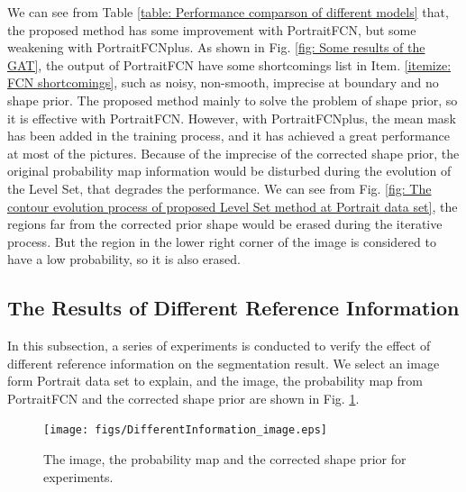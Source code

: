 We can see from Table \ref{table: Performance comparson of different models} that, the proposed method has some improvement with PortraitFCN, but some weakening with PortraitFCNplus. As shown in Fig. \ref{fig: Some results of the GAT}, the output of PortraitFCN have some shortcomings list in Item. \ref{itemize: FCN shortcomings}, such as noisy, non-smooth, imprecise at boundary and no shape prior. The proposed method mainly to solve the problem of shape prior, so it is effective with PortraitFCN. However, with PortraitFCNplus, the mean mask has been added in the training process, and it has achieved a great performance at most of the pictures. Because of the imprecise of the corrected shape prior, the original probability map information would be disturbed during the evolution of the Level Set, that degrades the performance. We can see from Fig. \ref{fig: The contour evolution process of proposed Level Set method at Portrait data set}, the regions far from the corrected prior shape would be erased during the iterative process. But the region in the lower right corner of the image is considered to have a low probability, so it is also erased.

\subsection{The Results of Different Reference Information}
In this subsection, a series of experiments is conducted to verify the effect of different reference information on the segmentation result. We select an image form Portrait data set to explain, and the image, the probability map from PortraitFCN and the corrected shape prior are shown in Fig. \ref{fig: The image, the probability map and the corrected shape prior for experiments}.
\begin{figure}[h]
    \centering
    \texttt{[image: figs/DifferentInformation\_image.eps]}
    \caption{The image, the probability map and the corrected shape prior for experiments.}
    \label{fig: The image, the probability map and the corrected shape prior for experiments}
\end{figure}

